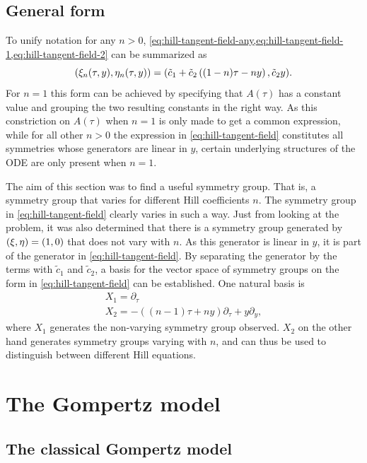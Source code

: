 \subsection{General form}

To unify notation for any \(n>0\), \cref{eq:hill-tangent-field-any,eq:hill-tangent-field-1,eq:hill-tangent-field-2} can be summarized as
\begin{equation} \label{eq:hill-tangent-field}
  \pqty{\xi_n(\tau,y),\eta_n(\tau,y)} = 
  \pqty{\tilde{c}_1 + \tilde{c}_2 \left( (1-n) \tau - n y \right), \tilde{c}_2 y}.
\end{equation}
For \(n=1\) this form can be achieved by specifying that \(A(\tau)\) has a constant value and grouping the two resulting constants in the right way.
As this constriction on \(A(\tau)\) when \(n=1\) is only made to get a common expression, while for all other \(n>0\) the expression in \cref{eq:hill-tangent-field} constitutes all symmetries whose generators are linear in \(y\), certain underlying structures of the ODE are only present when \(n=1\). %

The aim of this section was to find a useful symmetry group.
That is, a symmetry group that varies for different Hill coefficients \(n\).
The symmetry group in \cref{eq:hill-tangent-field} clearly varies in such a way.
Just from looking at the problem, it was also determined that there is a symmetry group generated by \(\pqty{\xi,\eta} = \pqty{1,0}\) that does not vary with \(n\).
As this generator is linear in \(y\), it is part of the generator in \cref{eq:hill-tangent-field}.
By separating the generator by the terms with \(\tilde{c}_1\) and \(\tilde{c}_2\), a basis for the vector space of symmetry groups on the form in \cref{eq:hill-tangent-field} can be established.
One natural basis is
\begin{gather}
  X_1 = \partial_\tau \\
  X_2 = - \left( (n-1) \tau + n y \right) \partial_\tau + y \partial_y,
\end{gather}
where \(X_1\) generates the non-varying symmetry group observed.
\(X_2\) on the other hand generates symmetry groups varying with \(n\), and can thus be used to distinguish between different Hill equations.

\section{The Gompertz model}

\subsection{The classical Gompertz model}

